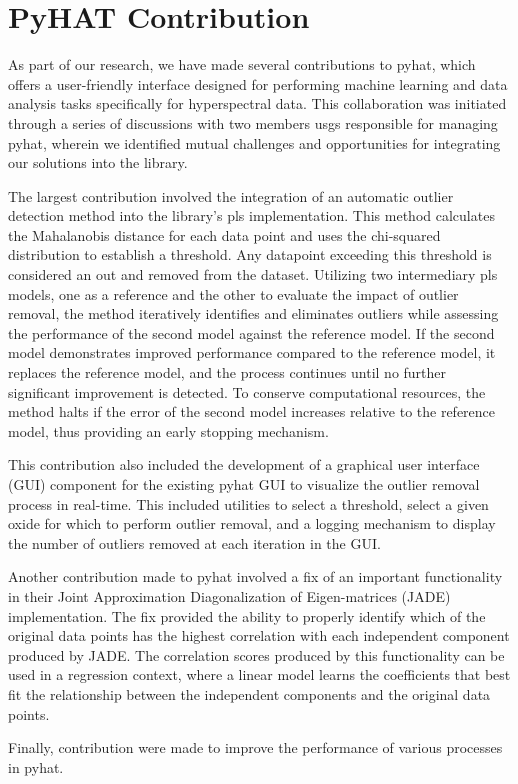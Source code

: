 \section{PyHAT Contribution}\label{sec:pyhat_contribution}
As part of our research, we have made several contributions to \gls{pyhat}, which offers a user-friendly interface designed for performing machine learning and data analysis tasks specifically for hyperspectral data.
This collaboration was initiated through a series of discussions with two members \gls{usgs} responsible for managing \gls{pyhat}, wherein we identified mutual challenges and opportunities for integrating our solutions into the library.

The largest contribution involved the integration of an automatic outlier detection method into the library's \gls{pls} implementation. 
This method calculates the Mahalanobis distance for each data point and uses the chi-squared distribution to establish a threshold.
Any datapoint exceeding this threshold is considered an out and removed from the dataset.
Utilizing two intermediary \gls{pls} models, one as a reference and the other to evaluate the impact of outlier removal, the method iteratively identifies and eliminates outliers while assessing the performance of the second model against the reference model. 
If the second model demonstrates improved performance compared to the reference model, it replaces the reference model, and the process continues until no further significant improvement is detected. 
To conserve computational resources, the method halts if the error of the second model increases relative to the reference model, thus providing an early stopping mechanism.

This contribution also included the development of a graphical user interface (GUI) component for the existing \gls{pyhat} GUI to visualize the outlier removal process in real-time.
This included utilities to select a threshold, select a given oxide for which to perform outlier removal, and a logging mechanism to display the number of outliers removed at each iteration in the GUI.

Another contribution made to \gls{pyhat} involved a fix of an important functionality in their Joint Approximation Diagonalization of Eigen-matrices (JADE) implementation.
The fix provided the ability to properly identify which of the original data points has the highest correlation with each independent component produced by JADE.
The correlation scores produced by this functionality can be used in a regression context, where a linear model learns the coefficients that best fit the relationship between the independent components and the original data points.

Finally, contribution were made to improve the performance of various processes in \gls{pyhat}.

 